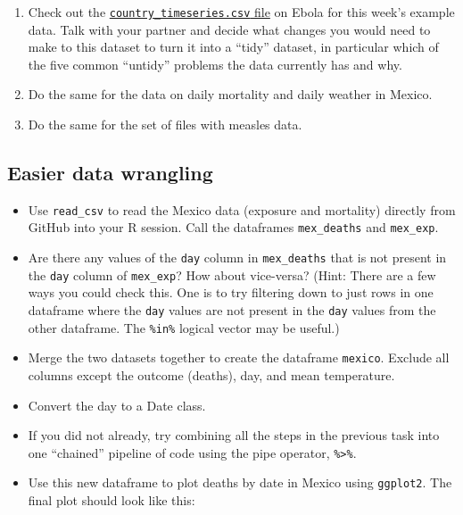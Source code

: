 \documentclass[]{book}
\providecommand{\tightlist}{%
  \setlength{\itemsep}{0pt}\setlength{\parskip}{0pt}}
\theoremstyle{definition}
\theoremstyle{definition}
\theoremstyle{definition}
\theoremstyle{remark}
\begin{document}
\begin{enumerate}
\def\labelenumi{\arabic{enumi}.}
\tightlist
\item
  Check out the
  \href{https://github.com/geanders/RProgrammingForResearch/raw/master/data/country_timeseries.csv}{\texttt{country\_timeseries.csv}
  file} on Ebola for this week's example data. Talk with your partner
  and decide what changes you would need to make to this dataset to turn
  it into a ``tidy'' dataset, in particular which of the five common
  ``untidy'' problems the data currently has and why.
\item
  Do the same for the data on daily mortality and daily weather in
  Mexico.
\item
  Do the same for the set of files with measles data.
\end{enumerate}

\subsection{Easier data wrangling}\label{easier-data-wrangling}

\begin{itemize}
\tightlist
\item
  Use \texttt{read\_csv} to read the Mexico data (exposure and
  mortality) directly from GitHub into your R session. Call the
  dataframes \texttt{mex\_deaths} and \texttt{mex\_exp}.
\item
  Are there any values of the \texttt{day} column in
  \texttt{mex\_deaths} that is not present in the \texttt{day} column of
  \texttt{mex\_exp}? How about vice-versa? (Hint: There are a few ways
  you could check this. One is to try filtering down to just rows in one
  dataframe where the \texttt{day} values are not present in the
  \texttt{day} values from the other dataframe. The \texttt{\%in\%}
  logical vector may be useful.)
\item
  Merge the two datasets together to create the dataframe
  \texttt{mexico}. Exclude all columns except the outcome (deaths), day,
  and mean temperature.
\item
  Convert the day to a Date class.
\item
  If you did not already, try combining all the steps in the previous
  task into one ``chained'' pipeline of code using the pipe operator,
  \texttt{\%\textgreater{}\%}.
\item
  Use this new dataframe to plot deaths by date in Mexico using
  \texttt{ggplot2}. The final plot should look like this:
\end{itemize}
\end{document}
